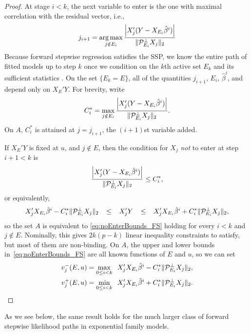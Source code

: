 \documentclass{article}
\begin{document}
\begin{proof}
  At stage $i < k$, the next variable to enter is the one with maximal correlation with the residual vector, i.e.,
  \[
  j_{i+1} = \operatorname*{arg\,max}_{j \notin E_i} 
  \frac{\left| X_j ' (Y - X_{E_i}\hat\beta^i) \right|}
  {\|\mathcal{P}_{E_i}^\perp X_j\|_2}
  \]
  Because forward stepwise regression satisfies the SSP, we know the entire path of fitted models up to step $k$ once we condition on the $k$th active set $E_k$ and its sufficient statistics . On the set $\{E_k=E\}$, all of the quantities $j_{i+1}$, $E_i$, $\hat\beta^i$, and  depend only on $X_E'Y$. For brevity, write 
  \[
  C_i^* = \max_{j \notin E_i} 
  \frac{\left| X_j ' (Y - X_{E_i}\hat\beta^i) \right|}
  {\|\mathcal{P}_{E_i}^\perp X_j\|_2}.
  \]
  On $A$, $C_i^*$ is attained at $j=j_{i+1}$, the $(i+1)$st variable added.

  If $X_E'Y$ is fixed at $u$, and $j \notin E$, then the condition for $X_j$ {\em not} to enter at step $i+1 < k$ is
  \[
  \frac{\left| X_j' (Y - X_{E_i}\hat\beta^i) \right|}
  {\|\mathcal{P}_{E_i}^\perp X_j\|_2} 
  \leq C_i^*,
  \]
  or equivalently,
  \begin{equation}\label{eq:noEnterBounds_FS}
    X_j' X_{E_i}\hat\beta^i -
    C_i^*\|\mathcal{P}_{E_{i}}^\perp X_{j}\|_2
    \;\;\;\leq\;\;\;
    X_j'Y
    \;\;\;\leq\;\;\;
    X_j' X_{E_i}\hat\beta^i +
    C_i^*\|\mathcal{P}_{E_{i}}^\perp X_{j}\|_2, 
  \end{equation}
  so the set $A$ is equivalent to 
  \eqref{eq:noEnterBounds_FS} holding
  for every $i < k$ and $j \notin E$. Nominally, this gives $2k(p-k)$
  linear inequality constraints to satisfy, but most of them are
  non-binding. On $A$, the upper and lower bounds
  in~\eqref{eq:noEnterBounds_FS}
  are all known functions of $E$ and $u$, so we can set
  \begin{align}\label{eq:vMinus_FS}
    v_j^-(E,u) &= \max_{0 \leq i < k} \;\;X_j' X_{E_i}\hat\beta^i -
    C_i^*\|\mathcal{P}_{E_{i}}^\perp X_{j}\|_2, \\
    \label{eq:vPlus_FS}
    v_j^+(E,u) &= \min_{0 \leq i < k} \;\;X_j' X_{E_i}\hat\beta^i +
    C_i^*\|\mathcal{P}_{E_{i}}^\perp X_{j}\|_2.
  \end{align}  
\end{proof}

As we see below, the same result holds for the much larger class of forward stepwise likelihood paths in exponential family models.
\end{document}
